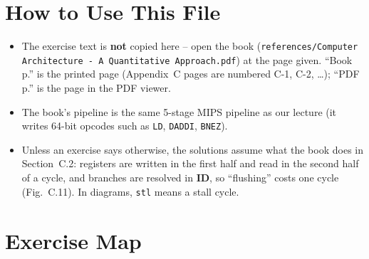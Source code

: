 \documentclass[11pt]{article}
\begin{document}
\sloppy
{}

\section{How to Use This File}

\begin{itemize}[leftmargin=*]
  \item The exercise text is \textbf{not} copied here -- open the book
  (\texttt{references/Computer Architecture - A Quantitative Approach.pdf})
  at the page given. ``Book p.'' is the printed page (Appendix~C pages are
  numbered C-1, C-2, \dots); ``PDF p.'' is the page in the PDF viewer.
  \item The book's pipeline is the same 5-stage MIPS pipeline as our lecture
  (it writes 64-bit opcodes such as \texttt{LD}, \texttt{DADDI},
  \texttt{BNEZ}).
  \item Unless an exercise says otherwise, the solutions assume what the book
  does in Section~C.2: registers are written in the first half and read in
  the second half of a cycle, and branches are resolved in \textbf{ID}, so
  ``flushing'' costs one cycle (Fig.~C.11). In diagrams, \texttt{stl} means
  a stall cycle.
\end{itemize}

\section{Exercise Map}
\end{document}
